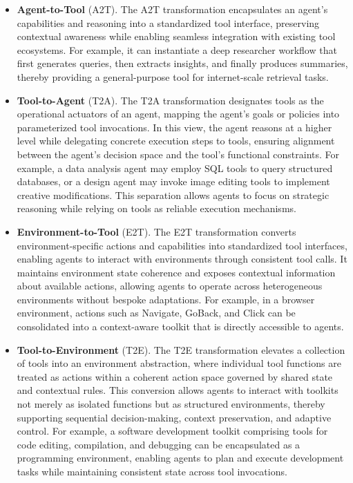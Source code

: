 \documentclass[11pt]{article}
\begin{document}
\begin{itemize}[leftmargin=*,itemsep=0.1em]
  \item \textbf{Agent-to-Tool} (A2T). The A2T transformation encapsulates an agent’s capabilities and reasoning into a standardized tool interface, preserving contextual awareness while enabling seamless integration with existing tool ecosystems. For example, it can instantiate a deep researcher workflow that first generates queries, then extracts insights, and finally produces summaries, thereby providing a general-purpose tool for internet-scale retrieval tasks.
  
  \item \textbf{Tool-to-Agent} (T2A). The T2A transformation designates tools as the operational actuators of an agent, mapping the agent’s goals or policies into parameterized tool invocations. In this view, the agent reasons at a higher level while delegating concrete execution steps to tools, ensuring alignment between the agent’s decision space and the tool’s functional constraints. For example, a data analysis agent may employ SQL tools to query structured databases, or a design agent may invoke image editing tools to implement creative modifications. This separation allows agents to focus on strategic reasoning while relying on tools as reliable execution mechanisms.
  
  \item \textbf{Environment-to-Tool} (E2T). The E2T transformation converts environment-specific actions and capabilities into standardized tool interfaces, enabling agents to interact with environments through consistent tool calls. It maintains environment state coherence and exposes contextual information about available actions, allowing agents to operate across heterogeneous environments without bespoke adaptations. For example, in a browser environment, actions such as Navigate, GoBack, and Click can be consolidated into a context-aware toolkit that is directly accessible to agents.
  
  \item \textbf{Tool-to-Environment} (T2E). The T2E transformation elevates a collection of tools into an environment abstraction, where individual tool functions are treated as actions within a coherent action space governed by shared state and contextual rules. This conversion allows agents to interact with toolkits not merely as isolated functions but as structured environments, thereby supporting sequential decision-making, context preservation, and adaptive control. For example, a software development toolkit comprising tools for code editing, compilation, and debugging can be encapsulated as a programming environment, enabling agents to plan and execute development tasks while maintaining consistent state across tool invocations.
  

\end{itemize}
\end{document}
